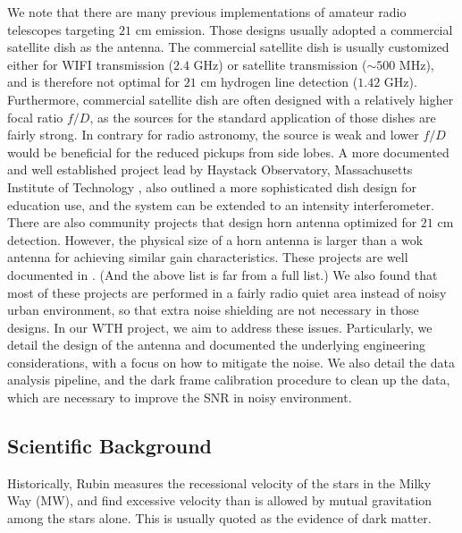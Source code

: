 \documentclass[12pt]{article}
\begin{document}
    We note that there are many previous implementations of amateur radio telescopes targeting $21$ cm emission.
    Those designs usually adopted a commercial satellite dish as the antenna. \cite{amateur-radio-dish-japan, amateur-dish-radio}
    The commercial satellite dish is usually customized either for WIFI transmission ($2.4$ GHz) or satellite transmission ($\sim 500$ MHz), and is therefore not optimal for $21$ cm hydrogen line detection ($1.42$ GHz).
    Furthermore, commercial satellite dish are often designed with a relatively higher focal ratio $f/D$, as the sources for the standard application of those dishes are fairly strong. 
    In contrary for radio astronomy, the source is weak and lower $f/D$ would be beneficial for the reduced pickups from side lobes.
    A more documented and well established project lead by Haystack Observatory, Massachusetts Institute of Technology \cite{mit-haystack-srt}, also outlined a more sophisticated dish design for education use, and the system can be extended to an intensity interferometer.
    There are also community projects that design horn antenna optimized for $21$ cm detection. 
    However, the physical size of a horn antenna is larger than a wok antenna for achieving similar gain characteristics.
    These projects are well documented in \cite{amateur-radio-horn-harvard,community-project-doc,physicsOpenLab-project, amateur-radio-horn-ieee, amateur-radio-horn-india}. (And the above list is far from a full list.)
    We also found that most of these projects are performed in a fairly radio quiet area instead of noisy urban environment, so that extra noise shielding are not necessary in those designs. 
    In our WTH project, we aim to address these issues. 
    Particularly, we detail the design of the antenna and documented the underlying engineering considerations, with a focus on how to mitigate the noise. 
    We also detail the data analysis pipeline, and the dark frame calibration procedure to clean up the data, which are necessary to improve the SNR in noisy environment.

    \subsection{Scientific Background}
    Historically, Rubin \cite{rubin-galaxy-rotation-curve} measures the recessional velocity of the stars in the Milky Way (MW), and find excessive velocity than is allowed by mutual gravitation among the stars alone. 
    This is usually quoted as the evidence of dark matter.
    
\end{document}
